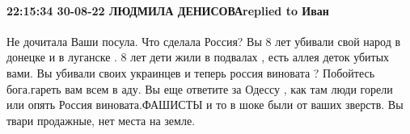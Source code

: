  
 
 
 
 

\paragraph{22:15:34 30-08-22 ЛЮДМИЛА ДЕНИСОВАreplied to Иван}

Не дочитала Ваши посула. Что сделала Россия? Вы 8 лет убивали свой народ в
донецке и в луганске . 8 лет дети жили в подвалах , есть аллея деток убитых
вами. Вы убивали своих украинцев и теперь россия виновата ? Побойтесь
бога.гареть вам всем в аду. Вы еще ответите за Одессу , как там люди горели или
опять Россия виновата.ФАШИСТЫ и то в шоке были от ваших зверств. Вы твари
продажные, нет места на земле.



